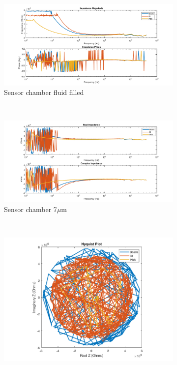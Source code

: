 \begin{figure}[h]
    \centering
    \begin{subfigure}[b]{\textwidth}
        \centering
        \includegraphics[width=\textwidth]{images/raw_IS_data_mag_phase.png}
        \caption{Sensor chamber fluid filled}
    \end{subfigure}
    \\
    \vspace{0.1 in}
    \begin{subfigure}[b]{\textwidth}
        \centering
        \includegraphics[width=\textwidth]{images/raw_IS_data_real_imag.png}
        \caption{Sensor chamber 7$\mu$m }
    \end{subfigure}
    \\
    \vspace{0.1 in}
    \begin{subfigure}[b]{\textwidth}
        \centering
        \includegraphics[width=\textwidth]{images/raw_IS_data_nyquist.png}

\end{subfigure}
\end{figure}
